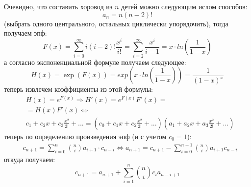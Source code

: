 Очевидно, что составить хоровод из $n$ детей можно следующим ислом способов:
\[
	a_n = n\left(n-2\right)!
\]
(выбрать одного центрального, остальных циклически упорядочить), тогда получаем эпф:
\[
	F\left(x\right) = \sum_{i=0}^\infty i\left(i-2\right)! \frac{x^i}{i!} = \sum_{i=2}^\infty \frac{x^i}{i-1} = x\cdot ln\left(\frac{1}{1-x}\right)
\]
а согласно экспоненциальной формуле получаем следующее:
\[
	H\left(x\right) = \exp\left(F\left(x\right)\right) = exp\left(x\cdot ln\left(\frac{1}{1-x}\right)\right) = \frac{1}{\left(1-x\right)^x}
\]
теперь извлечем коэффициенты из этой формулы:
\[
	\begin{split}
		&H\left(x\right) = e^{F\left(x\right)} \Rightarrow H'\left(x\right) = e^{F\left(x\right)}F'\left(x\right) = \\
		& = H\left(x\right)F'\left(x\right) \Leftrightarrow \\
		& c_1 + c_2 x + c_3\frac{x^2}{2!} + ... = \left(c_0 + c_1 x + c_2 \frac{x^2}{2!} + ...\right)\left(a_1 + a_2x + a_3\frac{x^2}{2!}+...\right)
	\end{split}
\]
теперь по определению произведения эпф (и с учетом $c_0 = 1$):
\[
	\begin{split}
		& c_{n+1} = \sum_{i=0}^n \binom{n}{i} a_{i+1}\cdot c_{n-i} \Leftrightarrow a_{n+1} = c_{n+1} - \sum_{i=0}^{n-1}\binom{n}{i}a_{i+1}c_{n-i}
	\end{split}
\]
откуда получаем:
\begin{equation}
	c_{n+1}  = a_{n+1} + \sum_{i=1}^n \binom{n}{i} c_i a_{n-i+1}
\end{equation}
